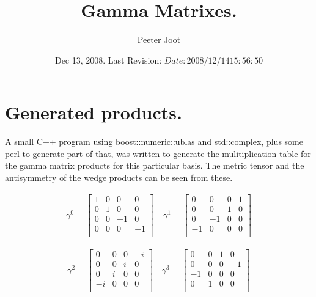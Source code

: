 \documentclass{article}
\title{ Gamma Matrixes. }
\author{Peeter Joot}
\date{ Dec 13, 2008.  Last Revision: $Date: 2008/12/14 15:56:50 $ }
\begin{document}
\maketitle{}

\section{ Generated products. }

A small C++ program using boost::numeric::ublas and std::complex,
plus some perl to generate part of that, was
written to generate the mulitiplication table for the gamma matrix products
for this particular basis.  The metric tensor and the antisymmetry of
the wedge products can be seen from these.



\begin{align*}
\gamma^0 = \begin{bmatrix}
 1  &  0  &  0  &  0  \\
 0  &  1  &  0  &  0  \\
 0  &  0  &  -1  &  0  \\
 0  &  0  &  0  &  -1  \\
\end{bmatrix} \quad
\gamma^1 = \begin{bmatrix}
 0  &  0  &  0  &  1  \\
 0  &  0  &  1  &  0  \\
 0  &  -1  &  0  &  0  \\
 -1  &  0  &  0  &  0  \\
\end{bmatrix}
\end{align*}

\begin{align*}
\gamma^2 = \begin{bmatrix}
 0  &  0  &  0  &  -i  \\
 0  &  0  &  i  &  0  \\
 0  &  i  &  0  &  0  \\
 -i  &  0  &  0  &  0  \\
\end{bmatrix}
\quad \gamma^3 = \begin{bmatrix}
 0  &  0  &  1  &  0  \\
 0  &  0  &  0  &  -1  \\
 -1  &  0  &  0  &  0  \\
 0  &  1  &  0  &  0  \\
\end{bmatrix}
\end{align*}
\end{document}
